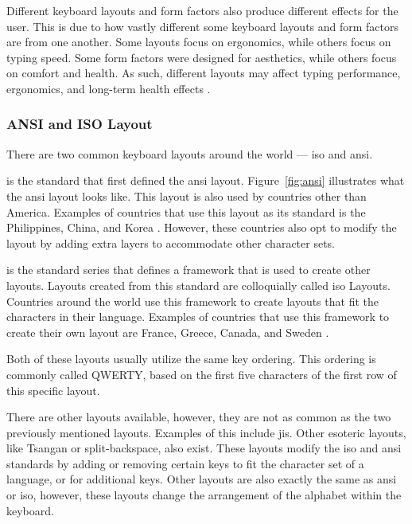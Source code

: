 \documentclass{report}
\begin{document}
Different keyboard layouts and form factors also produce different effects for
the user. This is due to how vastly different some keyboard layouts and form
factors are from one another. Some layouts focus on ergonomics, while others
focus on typing speed. Some form factors were designed for aesthetics, while
others focus on comfort and health. As such, different layouts may affect typing
performance, ergonomics, and long-term health effects \parencite{ciobanu2015}.

\subsubsection{ANSI and ISO Layout}

There are two common keyboard layouts around the world --- \ac{iso} and \ac{ansi}.

\citeauthor{ansi} is the standard that first defined the \ac{ansi} layout.
Figure~\ref{fig:ansi} illustrates what the \ac{ansi} layout looks like. This layout
is also used by countries other than America. Examples of countries that use
this layout as its standard is the Philippines, China, and Korea
\parencite{apple-layout}. However, these countries also opt to modify the layout
by adding extra layers to accommodate other character sets.

\citeauthor{iso} is the standard series that defines a framework that is used to
create other layouts. Layouts created from this standard are colloquially called
\ac{iso} Layouts. Countries around the world use this framework to create layouts
that fit the characters in their language. Examples of countries that use this
framework to create their own layout are France, Greece, Canada, and Sweden
\parencite{apple-layout}.

Both of these layouts usually utilize the same key ordering. This ordering is
commonly called QWERTY, based on the first five characters of the first row
of this specific layout.

There are other layouts available, however, they are not as common as the two
previously mentioned layouts. Examples of this include \ac{jis}. Other esoteric
layouts, like Tsangan or split-backspace, also exist. These layouts modify the
\ac{iso} and \ac{ansi} standards by adding or removing certain keys to fit the
character set of a language, or for additional keys. Other layouts are also
exactly the same as \ac{ansi} or \ac{iso}, however, these layouts change the
arrangement of the alphabet within the keyboard.
\end{document}
